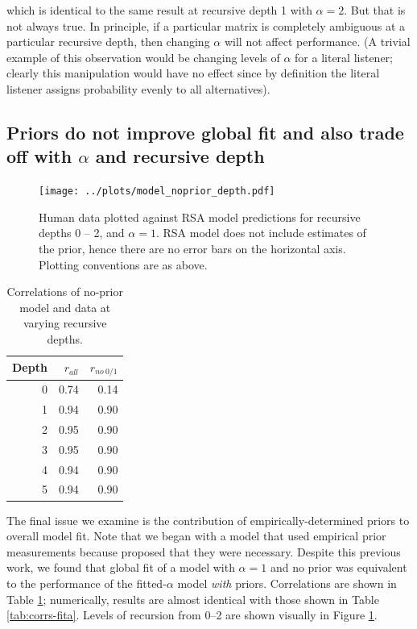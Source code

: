 \documentclass[man,noapacite]{apa2}
\begin{document}
\noindent which is identical to the same result at recursive depth 1 with $\alpha = 2$. But that is not always true. In principle, if a particular matrix is completely ambiguous at a particular recursive depth, then changing $\alpha$ will not affect performance. (A trivial example of this observation would be changing levels of $\alpha$ for a literal listener; clearly this manipulation would have no effect since by definition the literal listener assigns probability evenly to all alternatives).

\subsection{Priors do not improve global fit and also trade off with $\alpha$ and recursive depth}

\begin{figure}[t]
 \centering
 \texttt{[image: ../plots/model\_noprior\_depth.pdf]}
 \caption{\label{fig:noprior} Human data plotted against RSA model predictions for recursive depths 0 -- 2, and $\alpha=1$. RSA model does not include estimates of the prior, hence there are no error bars on the horizontal axis. Plotting conventions are as above.}
\end{figure}

\begin{table}[ht]
\centering
\begin{tabular}{rrr}
  \hline
  Depth & $r_{all}$ & $r_{no~0/1}$ \\
  \hline
  0 & 0.74 & 0.14 \\
    1 & 0.94 & 0.90 \\
    2 & 0.95 & 0.90 \\
    3 & 0.95 & 0.90 \\
    4 & 0.94 & 0.90 \\
    5 & 0.94 & 0.90 \\
   \hline
\end{tabular}
\caption{\label{tab:corrs-noprior} Correlations of no-prior model and data at varying recursive depths.}
\end{table}

The final issue we examine is the contribution of empirically-determined priors to overall model fit. Note that we began with a model that used empirical prior measurements because  proposed that they were necessary. Despite this previous work, we found that global fit of a model with $\alpha=1$ and no prior was equivalent to the performance of the fitted-$\alpha$ model \emph{with} priors. Correlations are shown in Table \ref{tab:corrs-noprior}; numerically, results are almost identical with those shown in Table \ref{tab:corrs-fita}. Levels of recursion from 0--2 are shown visually in Figure \ref{fig:noprior}.
\end{document}
